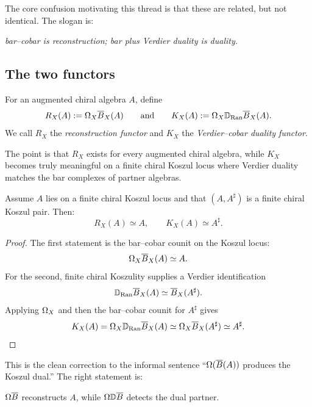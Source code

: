 The core confusion motivating this thread is that these are related, but not identical. The slogan is:

\begin{center}
\emph{bar--cobar is reconstruction; bar plus Verdier duality is duality.}
\end{center}

\subsection{The two functors}

\begin{definition}
For an augmented chiral algebra \(A\), define
\[
R_X(A):=\Omega_X\overline{B}_X(A)
\qquad\text{and}\qquad
K_X(A):=\Omega_X\mathbb D_{\operatorname{Ran}}\overline{B}_X(A).
\]
We call \(R_X\) the \emph{reconstruction functor} and \(K_X\) the \emph{Verdier--cobar duality functor}.
\end{definition}

The point is that \(R_X\) exists for every augmented chiral algebra, while \(K_X\) becomes truly meaningful on a finite chiral Koszul locus where Verdier duality matches the bar complexes of partner algebras.

\begin{theorem}\label{thm:reconstruction-vs-duality}
Assume \(A\) lies on a finite chiral Koszul locus and that \((A,A^\sharp)\) is a finite chiral Koszul pair. Then:
\[
R_X(A)\simeq A,
\qquad
K_X(A)\simeq A^\sharp.
\]
\end{theorem}

\begin{proof}
The first statement is the bar--cobar counit on the Koszul locus:
\[
\Omega_X\overline{B}_X(A)\simeq A.
\]
For the second, finite chiral Koszulity supplies a Verdier identification
\[
\mathbb D_{\operatorname{Ran}}\overline{B}_X(A)\simeq \overline{B}_X(A^\sharp).
\]
Applying \(\Omega_X\) and then the bar--cobar counit for \(A^\sharp\) gives
\[
K_X(A)=\Omega_X\mathbb D_{\operatorname{Ran}}\overline{B}_X(A)\simeq \Omega_X\overline{B}_X(A^\sharp)\simeq A^\sharp.
\qedhere
\]
\end{proof}

This is the clean correction to the informal sentence ``\(\Omega(\overline{B}(A))\) produces the Koszul dual.'' The right statement is:

\begin{center}
\(\Omega\overline{B}\) reconstructs \(A\), while \(\Omega\mathbb D\overline{B}\) detects the dual partner.
\end{center}

